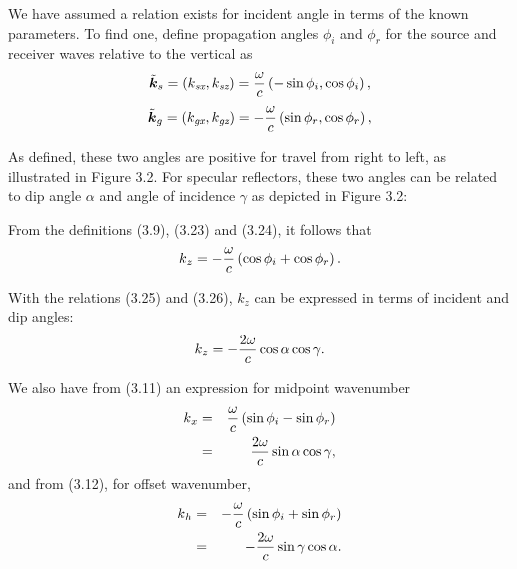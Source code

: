 We have assumed a relation exists for incident angle in terms of the known parameters. To find one, define propagation angles \(\phi _i\) and \(\phi
_r\) for the source and receiver waves relative to the vertical as
\begin{equation}
\tilde{\boldsymbol{k}}_s =\left(\text{\textit{$k_{\text{sx}}$}},\text{\textit{$k_{\text{sz}}$}}\right)=
\frac{\omega }{\text{\textit{$c$}}}\left(-\sin  \phi _{\text{\textit{$i$}}},\cos  \phi _{\text{\textit{$i$}}}\right),
\end{equation}
\begin{equation}
\tilde{\boldsymbol{k}}_{\text{\textit{$g$}}}=\left(\text{\textit{$k_{\text{gx}}$}},\text{\textit{$k_{\text{gz}}$}}\right)
=- \frac{\omega }{\text{\textit{$c$}}}\left(\sin  \phi _{\text{\textit{$r$}}},\cos  \phi _{\text{\textit{$r$}}}\right),
\end{equation}

As defined, these two angles are positive for travel from right to left, as illustrated in Figure 3.2. For specular reflectors, these two angles
can be related to dip angle $\alpha $ and angle of incidence $\gamma$ as depicted in Figure 3.2:

From the definitions (3.9), (3.23) and (3.24), it follows that
\begin{equation}\text{\textit{$k$}}_{\text{\textit{$z$}}}=-\frac{\omega }{\text{\textit{$c$}}} \left(\cos  \phi _{\text{\textit{$i$}}}+\cos  \phi
_{\text{\textit{$r$}}}\right).\end{equation}

With the relations (3.25) and (3.26), \(k_z\) can be expressed in terms of incident and dip angles:
\begin{equation}\text{\textit{$k$}}_{\text{\textit{$z$}}}=-\frac{2\omega }{\text{\textit{$c$}}} \cos  \alpha  \cos  \gamma .\end{equation}

We also have from (3.11) an expression for midpoint wavenumber
\begin{eqnarray}\text{\textit{$k$}}_{\text{\textit{$x$}}}& = & \frac{\omega }{\text{\textit{$c$}}} \left(\sin  \phi _{\text{\textit{$i$}}}-\sin  \phi
_{\text{\textit{$r$}}}\right)\nonumber\\
& = & \frac{2\omega }{\text{\textit{$c$}}} \sin  \alpha  \cos  \gamma ,\end{eqnarray}
and from (3.12), for offset wavenumber,
\begin{eqnarray}\text{\textit{$k$}}_{\text{\textit{$h$}}} & = & -\frac{\omega }{\text{\textit{$c$}}} \left(\sin  \phi _{\text{\textit{$i$}}}+\sin  \phi
_{\text{\textit{$r$}}}\right)\nonumber\\
& = & -\frac{2\omega }{\text{\textit{$c$}}} \sin  \gamma  \cos  \alpha .\end{eqnarray}


